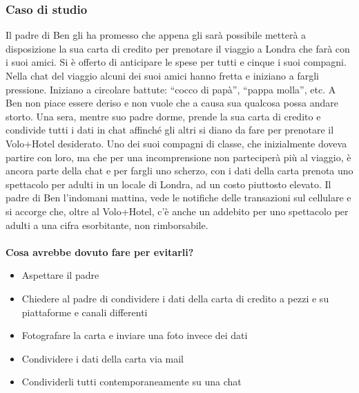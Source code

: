 \documentclass{article}
\begin{document}
\subsubsection{Caso di studio}
\label{sec:Caso6}
Il padre di Ben gli ha promesso che appena gli sarà possibile metterà a disposizione la sua carta di credito per prenotare il viaggio a Londra che farà con i suoi amici. Si è offerto di anticipare le spese per tutti e cinque i suoi compagni. Nella chat del viaggio alcuni dei suoi amici hanno fretta e iniziano a fargli pressione. Iniziano a circolare battute: “cocco di papà”, “pappa molla”, etc. A Ben non piace essere deriso e non vuole che a causa sua qualcosa possa andare storto. Una sera, mentre suo padre dorme, prende la sua carta di credito e condivide tutti i dati in chat affinché gli altri si diano da fare per prenotare il Volo+Hotel desiderato. Uno dei suoi compagni di classe, che inizialmente doveva partire con loro, ma che per una incomprensione non parteciperà più al viaggio, è ancora parte della chat e per fargli uno scherzo, con i dati della carta prenota uno spettacolo per adulti in un locale di Londra, ad un costo piuttosto elevato. Il padre di Ben l’indomani mattina, vede le notifiche delle transazioni sul cellulare e si accorge che, oltre al Volo+Hotel, c’è anche un addebito per uno spettacolo per adulti a una cifra esorbitante, non rimborsabile. 
\\\vspace{5mm}\\
\textbf{Cosa avrebbe dovuto fare per evitarli?}
\begin{itemize}
	\item Aspettare il padre		
	\item Chiedere al padre di condividere i dati della carta di credito a pezzi e su piattaforme e canali differenti		
	\item Fotografare la carta e inviare una foto invece dei dati		
	\item Condividere i dati della carta via mail		
	\item Condividerli tutti contemporaneamente su una chat
\end{itemize}
\end{document}
